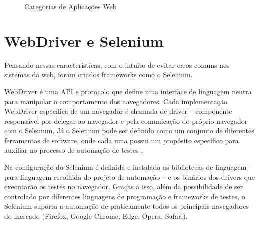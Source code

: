 \documentclass[
	12pt,				%
	openright,			%
	oneside,			%
	a4paper,			%
	chapter=TITLE,		%
	section=TITLE,		%
	subsection=TITLE,	%
	subsubsection=TITLE,%
	english,			%
	brazil				%
	]{abntex2}
\theoremstyle{definition}
\begin{document}
\begin{figure}[!h]
\centering
\caption{Categorias de Aplicações Web}
\label{Categorias de Aplicações Web}
\end{figure}

\pagebreak

\section{WebDriver e Selenium}

Pensando nessas características, com o intuito de evitar erros comuns nos sistemas da web, foram criados frameworks como o Selenium.

WebDriver é uma API e protocolo que define uma interface de linguagem neutra para manipular o comportamento dos navegadores. Cada implementação WebDriver específica de um navegador é chamada de driver – componente responsável por delegar ao navegador e pela comunicação do próprio navegador com o Selenium. Já o Selenium pode ser definido como um conjunto de diferentes ferramentas de software, onde cada uma possui um propósito específico para auxiliar no processo de automação de testes \cite{seleniumdoc}.

Na configuração do Selenium é definida e instalada as bibliotecas de linguagem – para linguagem escolhida do projeto de automação – e os binários dos drivers que executarão os testes no navegador. Graças a isso, além da possibilidade de ser controlado por diferentes linguagens de programação e frameworks de testes, o Selenium suporta a automação de praticamente todos os principais navegadores do mercado (Firefox, Google Chrome, Edge, Opera, Safari).
\end{document}
